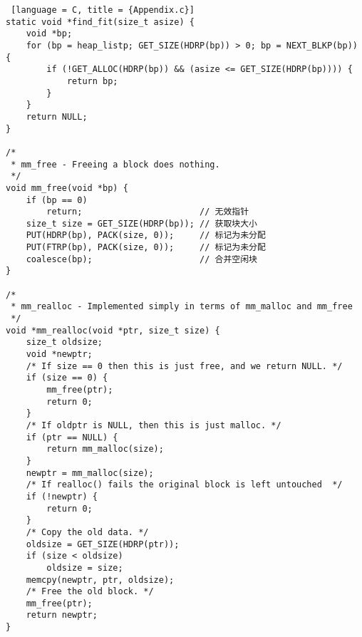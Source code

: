 \begin{lstlisting} [language = C, title = {Appendix.c}]
static void *find_fit(size_t asize) {
    void *bp;
    for (bp = heap_listp; GET_SIZE(HDRP(bp)) > 0; bp = NEXT_BLKP(bp)) {
        if (!GET_ALLOC(HDRP(bp)) && (asize <= GET_SIZE(HDRP(bp)))) {
            return bp;
        }
    }
    return NULL;
}

/*
 * mm_free - Freeing a block does nothing.
 */
void mm_free(void *bp) {
    if (bp == 0)
        return;                       // 无效指针
    size_t size = GET_SIZE(HDRP(bp)); // 获取块大小
    PUT(HDRP(bp), PACK(size, 0));     // 标记为未分配
    PUT(FTRP(bp), PACK(size, 0));     // 标记为未分配
    coalesce(bp);                     // 合并空闲块
}

/*
 * mm_realloc - Implemented simply in terms of mm_malloc and mm_free
 */
void *mm_realloc(void *ptr, size_t size) {
    size_t oldsize;
    void *newptr;
    /* If size == 0 then this is just free, and we return NULL. */
    if (size == 0) {
        mm_free(ptr);
        return 0;
    }
    /* If oldptr is NULL, then this is just malloc. */
    if (ptr == NULL) {
        return mm_malloc(size);
    }
    newptr = mm_malloc(size);
    /* If realloc() fails the original block is left untouched  */
    if (!newptr) {
        return 0;
    }
    /* Copy the old data. */
    oldsize = GET_SIZE(HDRP(ptr));
    if (size < oldsize)
        oldsize = size;
    memcpy(newptr, ptr, oldsize);
    /* Free the old block. */
    mm_free(ptr);
    return newptr;
}
\end{lstlisting}
